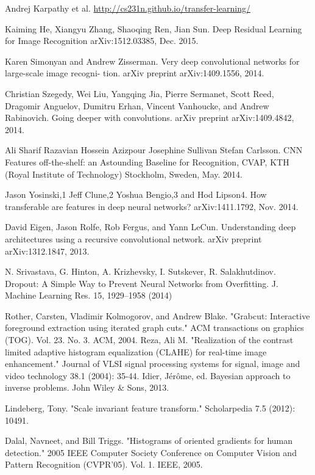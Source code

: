 \documentclass[journal, 10pt]{IEEEtran}
\begin{document}
\begin{thebibliography}{1}
    Andrej Karpathy et al. \url{http://cs231n.github.io/transfer-learning/}

    Kaiming He, Xiangyu Zhang, Shaoqing Ren, Jian Sun. Deep Residual Learning for Image Recognition 	arXiv:1512.03385, Dec. 2015.

    Karen Simonyan and Andrew Zisserman. Very deep convolutional networks for large-scale image recogni- tion. arXiv preprint arXiv:1409.1556, 2014.

    Christian Szegedy, Wei Liu, Yangqing Jia, Pierre Sermanet, Scott Reed, Dragomir Anguelov, Dumitru Erhan, Vincent Vanhoucke, and Andrew Rabinovich. Going deeper with convolutions. arXiv preprint arXiv:1409.4842, 2014.

    Ali Sharif Razavian Hossein Azizpour Josephine Sullivan Stefan Carlsson. CNN Features off-the-shelf: an Astounding Baseline for Recognition, CVAP, KTH (Royal Institute of Technology) Stockholm, Sweden, May. 2014.

    Jason Yosinski,1 Jeff Clune,2 Yoshua Bengio,3 and Hod Lipson4. How transferable are features in deep neural networks? arXiv:1411.1792, Nov. 2014.

    David Eigen, Jason Rolfe, Rob Fergus, and Yann LeCun. Understanding deep architectures using a recursive convolutional network. arXiv preprint arXiv:1312.1847, 2013.

    N. Srivastava, G. Hinton, A. Krizhevsky, I. Sutskever, R. Salakhutdinov. Dropout: A Simple Way to Prevent Neural Networks from Overfitting. J. Machine Learning Res. 15, 1929–1958 (2014)

    Rother, Carsten, Vladimir Kolmogorov, and Andrew Blake. "Grabcut: Interactive foreground extraction using iterated graph cuts." ACM transactions on graphics (TOG). Vol. 23. No. 3. ACM, 2004.
    Reza, Ali M. "Realization of the contrast limited adaptive histogram equalization (CLAHE) for real-time image enhancement." Journal of VLSI signal processing systems for signal, image and video technology 38.1 (2004): 35-44.
    Idier, Jérôme, ed. Bayesian approach to inverse problems. John Wiley \& Sons, 2013.

    Lindeberg, Tony. "Scale invariant feature transform." Scholarpedia 7.5 (2012): 10491.

    Dalal, Navneet, and Bill Triggs. "Histograms of oriented gradients for human detection." 2005 IEEE Computer Society Conference on Computer Vision and Pattern Recognition (CVPR'05). Vol. 1. IEEE, 2005.


\end{thebibliography}
\end{document}
